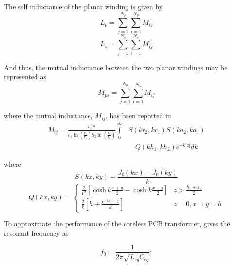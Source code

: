 \documentclass[conference]{IEEEtran}
\begin{document}
\hspace{-20pt} The self inductance of the planar winding is given by
\begin{equation}
	L_{p} = \sum\limits_{j=1}^{N_{p}}{\sum\limits_{i=1}^{N_{p}}{M_{ij}}}
\end{equation}
%
\begin{equation}
	L_{s} = \sum\limits_{j=1}^{N_{s}}{\sum\limits_{i=1}^{N_{s}}{M_{ij}}}
\end{equation}

\hspace{-20pt} And thus, the mutual inductance between the two planar windings may be represented as
%
\begin{equation}
	M_{ps} = \sum\limits_{j=1}^{N_{p}}{\sum\limits_{i=1}^{N_{s}}{M_{ij}}}
\end{equation}

\hspace{-20pt} where the mutual inductance, $ M_{ij} $, has been reported in \cite{HurleyDuffy}
\begin{equation}
\begin{split}
	M_{ij} = \frac{\mu_{0}\pi}{h_{1}\ln(\frac{r_{2}}{r_{1}})h_{2}\ln(\frac{a_{2}}{a_{1}})}\int\limits_{0}^{\infty} & S(kr_{2},kr_{1})S(ka_{2},ka_{1}) 
	\\ &\quad {Q(kh_{1},kh_{2})e^{-k|z|}dk}
\end{split}
\end{equation}

\hspace{-20pt} where
\begin{equation}
	S(kx, ky) = \frac{J_{0}(kx) - J_{0}(ky)}{k}
\end{equation}
%
\begin{equation}
	Q(kx, ky) = \left\{
		\begin{array}{lr}
		\frac{2}{k^{2}} \left[ \cosh{k\frac{x+y}{2}}-\cosh{k\frac{x-y}{2}} \right] & z>\frac{h_{1}+h_{2}}{2} \\
		\frac{2}{k} \left[ h+\frac{e^{-kh}-1}{k} \right] & z=0, x=y=h
		\end{array}
   \right.
\end{equation}

\hspace{-20pt} To approximate the performance of the coreless PCB transformer, \cite{TangHuiFundamental} gives the resonant frequency as

\begin{equation}
	f_{0} = \frac{1}{2\pi\sqrt{L_{eq}C_{eq}}};
\end{equation}
\end{document}
